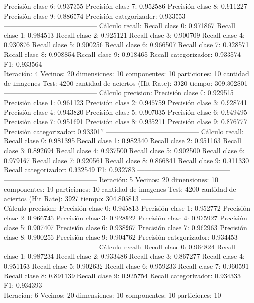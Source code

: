 Precisión clase 6: 0.937355
Precisión clase 7: 0.952586
Precisión clase 8: 0.911227
Precisión clase 9: 0.886574
Precisión categorizador: 0.933553
-----------------------------------------
Cálculo recall: 
Recall clase 0: 0.971867
Recall clase 1: 0.984513
Recall clase 2: 0.925121
Recall clase 3: 0.900709
Recall clase 4: 0.930876
Recall clase 5: 0.900256
Recall clase 6: 0.966507
Recall clase 7: 0.928571
Recall clase 8: 0.908854
Recall clase 9: 0.918465
Recall categorizador: 0.933574
F1: 0.933564
-----------------------------------------
-----------------------------------------
Iteración: 4
Vecinos: 20
dimensiones: 10
componentes: 10
particiones: 10
cantidad de imagenes Test: 4200
cantidad de aciertos (Hit Rate): 3920
tiempo: 309.802801
-----------------------------------------
Cálculo precision: 
Precisión clase 0: 0.929515
Precisión clase 1: 0.961123
Precisión clase 2: 0.946759
Precisión clase 3: 0.928741
Precisión clase 4: 0.943820
Precisión clase 5: 0.907035
Precisión clase 6: 0.949495
Precisión clase 7: 0.951691
Precisión clase 8: 0.935211
Precisión clase 9: 0.876777
Precisión categorizador: 0.933017
-----------------------------------------
Cálculo recall: 
Recall clase 0: 0.981395
Recall clase 1: 0.982340
Recall clase 2: 0.951163
Recall clase 3: 0.892694
Recall clase 4: 0.937500
Recall clase 5: 0.902500
Recall clase 6: 0.979167
Recall clase 7: 0.920561
Recall clase 8: 0.866841
Recall clase 9: 0.911330
Recall categorizador: 0.932549
F1: 0.932783
-----------------------------------------
-----------------------------------------
Iteración: 5
Vecinos: 20
dimensiones: 10
componentes: 10
particiones: 10
cantidad de imagenes Test: 4200
cantidad de aciertos (Hit Rate): 3927
tiempo: 304.805813
-----------------------------------------
Cálculo precision: 
Precisión clase 0: 0.945813
Precisión clase 1: 0.952772
Precisión clase 2: 0.966746
Precisión clase 3: 0.928922
Precisión clase 4: 0.935927
Precisión clase 5: 0.907407
Precisión clase 6: 0.938967
Precisión clase 7: 0.962963
Precisión clase 8: 0.900256
Precisión clase 9: 0.904762
Precisión categorizador: 0.934453
-----------------------------------------
Cálculo recall: 
Recall clase 0: 0.964824
Recall clase 1: 0.987234
Recall clase 2: 0.933486
Recall clase 3: 0.867277
Recall clase 4: 0.951163
Recall clase 5: 0.902632
Recall clase 6: 0.959233
Recall clase 7: 0.960591
Recall clase 8: 0.891139
Recall clase 9: 0.925754
Recall categorizador: 0.934333
F1: 0.934393
-----------------------------------------
-----------------------------------------
Iteración: 6
Vecinos: 20
dimensiones: 10
componentes: 10
particiones: 10
